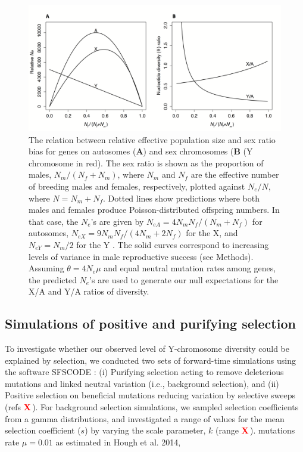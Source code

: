 \documentclass[9pt,twocolumn,twoside]{gsajnl}
\newcommand{\X}{\textcolor{red}{\bf X\,}}
\begin{document}
\begin{figure}[htbp]
\centering
\includegraphics[width=\linewidth]{Figure1.png}
\caption{The relation between relative effective population size and sex ratio bias for genes on autosomes (\textbf{A}) and sex chromosomes (\textbf{B} (Y chromosome in red). The sex ratio is shown as the proportion of males, $N_{m}/(N_{f}+N_{m})$, where $N_{m}$ and $N_{f}$ are the effective number of breeding males and females, respectively, plotted against $N_{e}/N$, where $N=N_{m}+N_{f}$. Dotted lines show predictions where both males and females produce Poisson-distributed offspring numbers. In that case, the $N_{e}$'s are given by $N_{e{A}}=4N_{m}N_{f}/(N_{m}+N_{f})$ for autosomes, $N_{e{X}}=9N_{m}N_{f}/(4N_{m}+2N_{f})$ for the X, and $N_{e{Y}}=N_{m}/2$ for the Y \citep{wright1931evolution}. The solid curves correspond to increasing levels of variance in male reproductive success \citep{nomura2002effective} (see Methods). Assuming $\theta=4N_{e}\mu$ and equal neutral mutation rates among genes, the predicted $N_{e}$'s are used to generate our null expectations for the X/A and Y/A ratios of diversity.  
}%
\label{fig:spectrum}
\end{figure}

\subsection*{Simulations of positive and purifying selection}
To investigate whether our observed level of Y-chromosome diversity could be explained by selection, we conducted two sets of forward-time simulations using the software SFSCODE \citep{hernandez2008flexible}: (i) Purifying selection acting to remove deleterious mutations and linked neutral variation (i.e., background selection), and (ii) Positive selection on beneficial mutations reducing variation by selective sweeps (refs \X). For background selection simulations, we sampled selection coefficients from a gamma distributions, and investigated a range of values for the mean selection coefficient ($s$) by varying the scale parameter, $k$ (range \X). mutations rate $\mu=0.01$ as estimated in Hough et al. 2014, 
\end{document}
